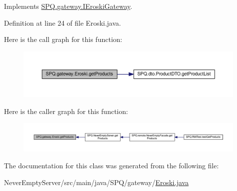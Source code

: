 Implements \mbox{\hyperlink{interface_s_p_q_1_1gateway_1_1_i_eroski_gateway_a6263f66378bc39296c6ea003642d79b9}{S\+P\+Q.\+gateway.\+I\+Eroski\+Gateway}}.



Definition at line 24 of file Eroski.\+java.

Here is the call graph for this function\+:\nopagebreak
\begin{figure}[H]
\begin{center}
\leavevmode
\includegraphics[width=350pt]{class_s_p_q_1_1gateway_1_1_eroski_acfd174565206c16fb55489786957b8de_cgraph}
\end{center}
\end{figure}
Here is the caller graph for this function\+:\nopagebreak
\begin{figure}[H]
\begin{center}
\leavevmode
\includegraphics[width=350pt]{class_s_p_q_1_1gateway_1_1_eroski_acfd174565206c16fb55489786957b8de_icgraph}
\end{center}
\end{figure}


The documentation for this class was generated from the following file\+:\begin{DoxyCompactItemize}
\item 
Never\+Empty\+Server/src/main/java/\+S\+P\+Q/gateway/\mbox{\hyperlink{_eroski_8java}{Eroski.\+java}}\end{DoxyCompactItemize}
